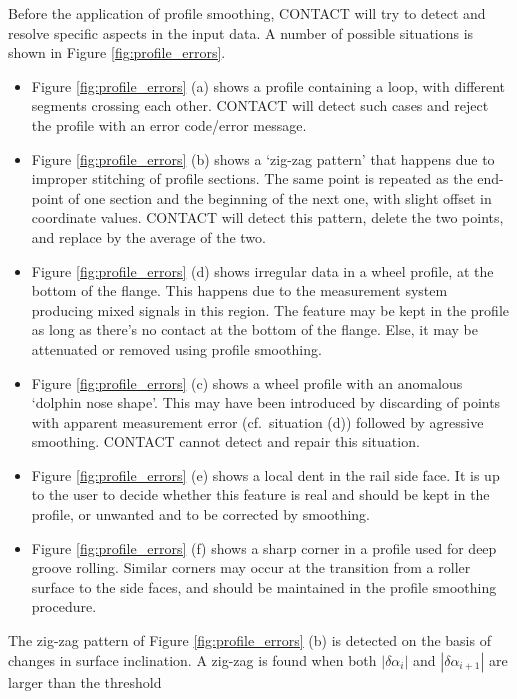 \documentclass[12pt]{report}
\begin{document}
Before the application of profile smoothing, CONTACT will try to detect and
resolve specific aspects in the input data. A number of possible situations is
shown in Figure \ref{fig:profile_errors}.
\begin{itemize}
\item Figure \ref{fig:profile_errors} (a) shows a profile containing a loop,
        with different segments crossing each other. CONTACT will detect
        such cases and reject the profile with an error code/error message.
\item Figure \ref{fig:profile_errors} (b) shows a `zig-zag pattern' that
        happens due to improper stitching of profile sections. The same
        point is repeated as the end-point of one section and the beginning
        of the next one, with slight offset in coordinate values. CONTACT
        will detect this pattern, delete the two points, and replace by the
        average of the two.
\item Figure \ref{fig:profile_errors} (d) shows irregular data in a wheel
        profile, at the bottom of the flange. This happens due to the
        measurement system producing mixed signals in this region.
        The feature may be kept in the profile as long as there's no
        contact at the bottom of the flange. Else, it may be attenuated or
        removed using profile smoothing.
\item Figure \ref{fig:profile_errors} (c) shows a wheel profile with an
        anomalous `dolphin nose shape'. This may have been introduced by
        discarding of points with apparent measurement error (cf.\ situation
        (d)) followed by agressive smoothing. CONTACT cannot detect and
        repair this situation.
\item Figure \ref{fig:profile_errors} (e) shows a local dent in the rail
        side face. It is up to the user to decide whether this feature
        is real and should be kept in the profile, or unwanted and to be
        corrected by smoothing.
\item Figure \ref{fig:profile_errors} (f) shows a sharp corner in a
        profile used for deep groove rolling. Similar corners may occur
        at the transition from a roller surface to the side faces, and
        should be maintained in the profile smoothing procedure.
\end{itemize}
The zig-zag pattern of Figure \ref{fig:profile_errors} (b) is detected on
the basis of changes in surface inclination. A zig-zag is found when both
$|\delta\alpha_i|$ and $|\delta\alpha_{i+1}|$ are larger than the threshold
\end{document}
